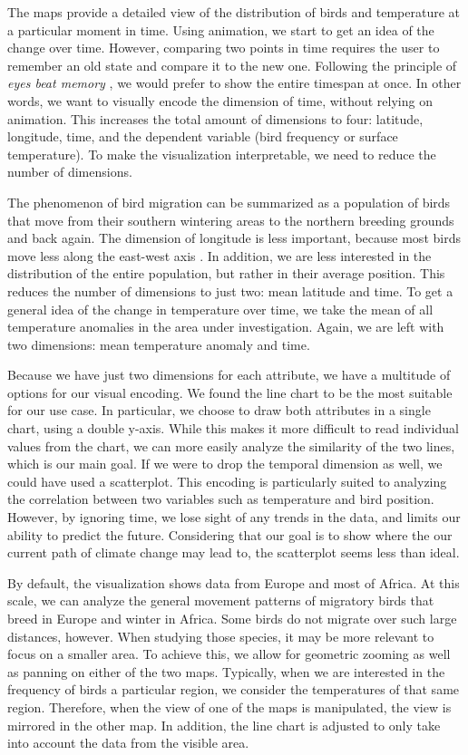 \documentclass[journal]{vgtc}                %
\begin{document}
The maps provide a detailed view of the distribution of birds and temperature at a particular moment in time. Using animation, we start to get an idea of the change over time. However, comparing two points in time requires the user to remember an old state and compare it to the new one. Following the principle of \emph{eyes beat memory} \cite{munzner2014visualization}, we would prefer to show the entire timespan at once. In other words, we want to visually encode the dimension of time, without relying on animation. This increases the total amount of dimensions to four: latitude, longitude, time, and the dependent variable (bird frequency or surface temperature). To make the visualization interpretable, we need to reduce the number of dimensions.

The phenomenon of bird migration can be summarized as a population of birds that move from their southern wintering areas to the northern breeding grounds and back again. The dimension of longitude is less important, because most birds move less along the east-west axis \cite{alerstam1993bird}. In addition, we are less interested in the distribution of the entire population, but rather in their average position. This reduces the number of dimensions to just two: mean latitude and time. To get a general idea of the change in temperature over time, we take the mean of all temperature anomalies in the area under investigation. Again, we are left with two dimensions: mean temperature anomaly and time.

Because we have just two dimensions for each attribute, we have a multitude of options for our visual encoding. We found the line chart to be the most suitable for our use case. In particular, we choose to draw both attributes in a single chart, using a double y-axis. While this makes it more difficult to read individual values from the chart, we can more easily analyze the similarity of the two lines, which is our main goal. If we were to drop the temporal dimension as well, we could have used a scatterplot. This encoding is particularly suited to analyzing the correlation between two variables such as temperature and bird position. However, by ignoring time, we lose sight of any trends in the data, and limits our ability to predict the future. Considering that our goal is to show where the our current path of climate change may lead to, the scatterplot seems less than ideal.

By default, the visualization shows data from Europe and most of Africa. At this scale, we can analyze the general movement patterns of migratory birds that breed in Europe and winter in Africa. Some birds do not migrate over such large distances, however. When studying those species, it may be more relevant to focus on a smaller area. To achieve this, we allow for geometric zooming as well as panning on either of the two maps. Typically, when we are interested in the frequency of birds a particular region, we consider the temperatures of that same region. Therefore, when the view of one of the maps is manipulated, the view is mirrored in the other map. In addition, the line chart is adjusted to only take into account the data from the visible area.
\end{document}
